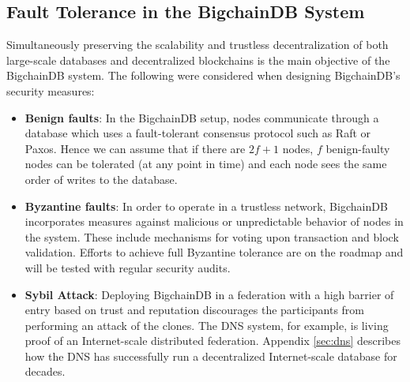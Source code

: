 \subsection{Fault Tolerance in the BigchainDB System}

Simultaneously preserving the scalability and trustless decentralization of both large-scale databases and decentralized blockchains is the main objective of the BigchainDB system. The following were considered when designing BigchainDB's security measures:

\begin{itemize}
  \item \textbf{Benign faults}: In the BigchainDB setup, nodes communicate through a database which uses a fault-tolerant consensus protocol such as Raft or Paxos. Hence we can assume that if there are $2f + 1$ nodes, $f$ benign-faulty nodes can be tolerated (at any point in time) and each node sees the same order of writes to the database.
  \item \textbf{Byzantine faults}: In order to operate in a trustless network, BigchainDB incorporates measures against malicious or unpredictable behavior of nodes in the system. These include mechanisms for voting upon transaction and block validation. Efforts to achieve full Byzantine tolerance are on the roadmap and will be tested with regular security audits.
  \item \textbf{Sybil Attack}: Deploying BigchainDB in a federation with a high barrier of entry based on trust and reputation discourages the participants from performing an attack of the clones. The DNS system, for example, is living proof of an Internet-scale distributed federation. Appendix \ref{sec:dns} describes how the DNS has successfully run a decentralized Internet-scale database for decades.
\end{itemize}